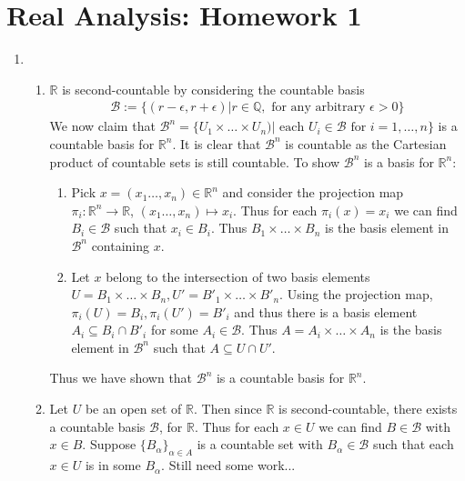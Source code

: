 \documentclass[a4paper,12pt]{article}
\theoremstyle{definition}
\begin{document}
\section*{Real Analysis: Homework 1}

\begin{enumerate}

\item
\begin{enumerate}
\item $\mathbb{R}$ is second-countable by considering the countable basis 
\begin{align*}
\mathcal{B}:=\{(r-\epsilon,r+\epsilon)| r \in \mathbb{Q}, \text{ for any arbitrary }\epsilon >0\}
\end{align*}
We now claim that $\mathcal{B}^n = \{U_1\times \ldots\times U_n)|\text{ each }U_i\in \mathcal{B}\text{ for }i=1,\ldots, n\}$ is a countable basis for $\mathbb{R}^n$. It is clear that $\mathcal{B}^n$ is countable as the Cartesian product of countable sets is still countable. To show $\mathcal{B}^n$ is a basis for $\mathbb{R}^n$:
\begin{enumerate}[(1)]
\item Pick $x = (x_1\ldots, x_n) \in \mathbb{R}^n$ and consider the projection map $\pi_i: \mathbb{R}^n \to \mathbb{R}$, $(x_1\ldots, x_n) \mapsto x_i$. Thus for each $\pi_i(x) = x_i$ we can find $B_i \in \mathcal{B}$ such that $x_i \in B_i$. Thus $B_1 \times \ldots \times B_n$ is the basis element in $\mathcal{B}^n$ containing $x$.
\item Let $x$ belong to the intersection of two basis elements $U = B_1 \times \ldots \times B_n, U' = B'_1 \times \ldots \times B'_n$. Using the projection map, $\pi_i(U) = B_i, \pi_i(U') = B'_i$ and thus there is a basis element $A_i \subseteq B_i \cap B'_i$ for some $A_i \in \mathcal{B}$. Thus $A = A_i \times \ldots \times A_n$ is the basis element in $\mathcal{B}^n$ such that $A \subseteq U \cap U'$.
\end{enumerate}
Thus we have shown that $\mathcal{B}^n$ is a countable basis for $\mathbb{R}^n$.



\item Let $U$ be an open set of $\mathbb{R}$. Then since $\mathbb{R}$ is second-countable, there exists a countable basis $\mathcal{B}$, for $\mathbb{R}$. Thus for each $x \in U$ we can find $B \in \mathcal{B}$ with $x \in B$. Suppose $\{B_{\alpha}\}_{\alpha\in A}$ is a countable set with $B_\alpha \in \mathcal{B}$ such that each $x \in U$ is in some $B_{\alpha}$. Still need some work...
\end{enumerate}


\end{enumerate}
\end{document}

